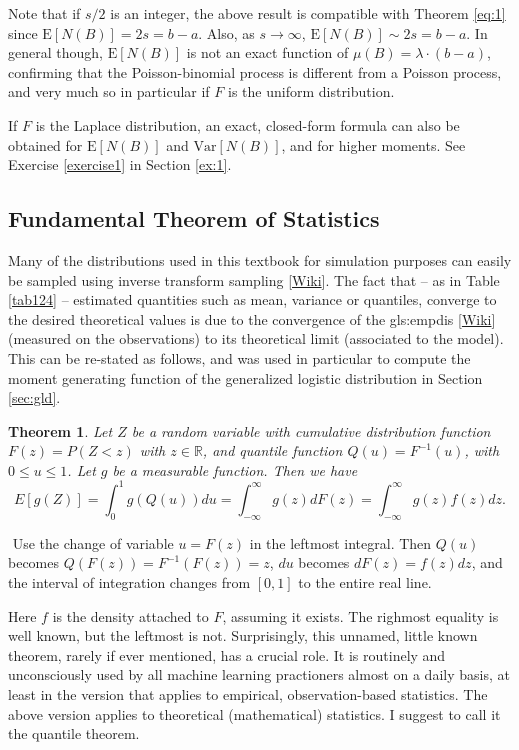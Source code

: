 \documentclass[10pt]{article}
\newtheorem{theorem}{Theorem}[section]
\newenvironment{proof}[1][Proof]{\begin{trivlist}
\item[\hskip \labelsep {\bfseries #1}]}{\end{trivlist}}
\newcommand{\qed}{\nobreak \ifvmode \relax \else
      \ifdim\lastskip<1.5em \hskip-\lastskip
      \hskip1.5em plus0em minus0.5em \fi \nobreak
      \vrule height0.75em width0.5em depth0.25em\fi}
\begin{document}
Note that if $s/2$ is an integer, the above result is compatible with Theorem \ref{eq:1} since $\mbox{E}[N(B)]=2s = b-a$. Also, as $s\rightarrow\infty$, $\mbox{E}[N(B)]\sim 2s=b-a$. In general though, $\mbox{E}[N(B)]$ is not an exact function of $\mu(B)=\lambda\cdot (b-a)$, confirming that the Poisson-binomial process is different from a Poisson process, and very much so in particular if $F$ is the uniform distribution.

If $F$ is the \textcolor{index}{Laplace distribution}, an exact, closed-form formula can also be obtained for $\mbox{E}[N(B)]$ and $\mbox{Var}[N(B)]$, and for higher moments.
See Exercise \ref{exercise1} in Section \ref{ex:1}.

\subsection{Fundamental Theorem of Statistics}

Many of the distributions used in this textbook for simulation purposes can easily be sampled using \textcolor{index}{inverse transform sampling} [\href{https://en.wikipedia.org/wiki/Inverse_transform_sampling}{Wiki}]. The fact that -- as in Table \ref{tab124} -- estimated quantities such as mean, variance or quantiles, converge to the desired theoretical values is due to the convergence of the  \gls{gls:empdis} [\href{https://en.wikipedia.org/wiki/Empirical_distribution_function}{Wiki}] 
 (measured on the observations) to its theoretical limit (associated to the model). This can be re-stated as follows, and was used in particular to compute the moment generating function of the generalized logistic distribution in Section \ref{sec:gld}.

\begin{theorem}
\label{sums7}
Let $Z$ be a random variable with cumulative distribution function $F(z)=P(Z<z)$ with $z\in\mathbb{R}$, and quantile function $Q(u)=F^{-1}(u)$, with $0\leq u \leq 1$. Let $g$ be a measurable function. Then we have
$$E[g(Z)] = \int_0^1 g(Q(u))du=\int_{-\infty}^{\infty}g(z)dF(z)=\int_{-\infty}^{\infty}g(z)f(z)dz.$$
 \end{theorem}
\begin{proof}
$ $ \newline
Use the change of variable $u=F(z)$ in the leftmost integral. Then $Q(u)$ becomes $Q(F(z))=F^{-1}(F(z))=z$, $du$ becomes $dF(z)=f(z)dz$, and the interval of integration changes from $[0, 1]$ to the entire real line. \qed
\end{proof}
Here $f$ is the density attached to $F$, assuming it exists. The righmost equality is well known, but the leftmost is not. Surprisingly, this unnamed, little known theorem, rarely if ever mentioned, has a crucial role. It is routinely and unconsciously used by all machine learning practioners almost on a daily basis, at least in the version that applies to empirical, observation-based statistics. The above version applies to theoretical (mathematical) statistics. I suggest to call it the \textcolor{index}{quantile theorem}.
\end{document}
